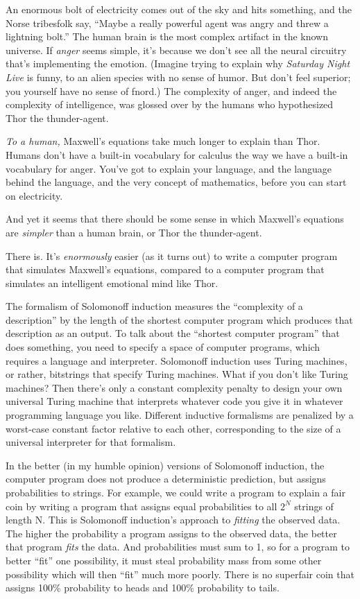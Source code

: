 {
 An enormous bolt of electricity comes out of the sky and hits
something, and the Norse tribesfolk say, ``Maybe a
really powerful agent was angry and threw a lightning
bolt.'' The human brain is the most complex artifact
in the known universe. If \textit{anger} seems simple,
it's because we don't see all the
neural circuitry that's implementing the emotion.
(Imagine trying to explain why \textit{Saturday Night Live} is funny,
to an alien species with no sense of humor. But don't
feel superior; you yourself have no sense of fnord.) The complexity of
anger, and indeed the complexity of intelligence, was glossed over by
the humans who hypothesized Thor the thunder-agent.}

{
 \textit{To a human,} Maxwell's equations take much
longer to explain than Thor. Humans don't have a
built-in vocabulary for calculus the way we have a built-in vocabulary
for anger. You've got to explain your language, and the
language behind the language, and the very concept of mathematics,
before you can start on electricity.}

{
 And yet it seems that there should be some sense in which
Maxwell's equations are \textit{simpler} than a human
brain, or Thor the thunder-agent.}

{
 There is. It's \textit{enormously} easier (as it
turns out) to write a computer program that simulates
Maxwell's equations, compared to a computer program
that simulates an intelligent emotional mind like Thor.}

{
 The formalism of Solomonoff induction measures the
``complexity of a description'' by
the length of the shortest computer program which produces that
description as an output. To talk about the ``shortest
computer program'' that does something, you need to
specify a space of computer programs, which requires a language and
interpreter. Solomonoff induction uses Turing machines, or rather,
bitstrings that specify Turing machines. What if you
don't like Turing machines? Then
there's only a constant complexity penalty to design
your own universal Turing machine that interprets whatever code you
give it in whatever programming language you like. Different inductive
formalisms are penalized by a worst-case constant factor relative to
each other, corresponding to the size of a universal interpreter for
that formalism.}

{
 In the better (in my humble opinion) versions of Solomonoff
induction, the computer program does not produce a deterministic
prediction, but assigns probabilities to strings. For example, we could
write a program to explain a fair coin by writing a program that
assigns equal probabilities to all $2^N$ strings of
length N. This is Solomonoff induction's approach to
\textit{fitting} the observed data. The higher the probability a
program assigns to the observed data, the better that program
\textit{fits} the data. And probabilities must sum to 1, so for a
program to better ``fit'' one
possibility, it must steal probability mass from some other possibility
which will then ``fit'' much more
poorly. There is no superfair coin that assigns 100\% probability to
heads and 100\% probability to tails.}

